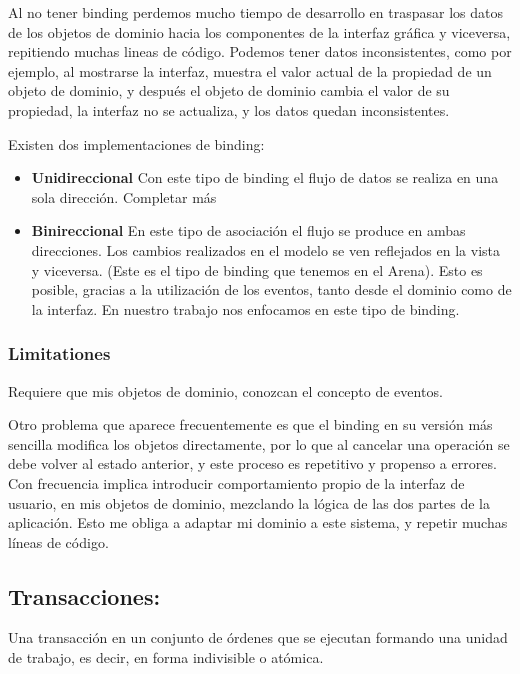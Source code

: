 Al no tener binding perdemos mucho tiempo de desarrollo en  traspasar los
datos de los objetos de dominio hacia los componentes de la interfaz gráfica y
viceversa, repitiendo muchas lineas de código.
Podemos tener datos inconsistentes, como por ejemplo, al mostrarse la interfaz,
muestra el valor actual de la propiedad de un objeto de dominio, y después el
objeto de dominio cambia el valor de su propiedad, la interfaz no se actualiza,
y los datos quedan inconsistentes.

\bigskip

Existen dos implementaciones de binding:

\begin {itemize}

\item {\bf Unidireccional}
Con este tipo de binding el flujo de datos se realiza en una sola dirección.
{Completar más}


\item {\bf Binireccional}
En este tipo de asociación el flujo se produce en ambas direcciones. Los cambios
realizados en el modelo se ven reflejados  en la vista y viceversa. (Este es el
tipo de binding que tenemos en el Arena). Esto es posible, gracias a la
utilización de los eventos, tanto desde el dominio como de la interfaz.
En nuestro trabajo nos enfocamos en este tipo de binding.


\end {itemize}


\subsubsection{Limitationes}
Requiere que mis objetos de dominio, conozcan el concepto de eventos.

Otro problema que aparece frecuentemente es que el binding en su versión más 
sencilla modifica los objetos directamente, por lo que al cancelar una operación 
se debe volver al estado anterior, y este proceso es repetitivo y propenso a errores. 
Con frecuencia implica introducir comportamiento propio de la interfaz de
usuario, en mis objetos de dominio, mezclando la lógica de las dos partes de
la aplicación. Esto me obliga a adaptar mi dominio a este sistema, y repetir
muchas líneas de código.
	
\subsection{Transacciones:}	

Una transacción en un conjunto de órdenes que se ejecutan formando una unidad de
trabajo, es decir, en forma indivisible o atómica.

